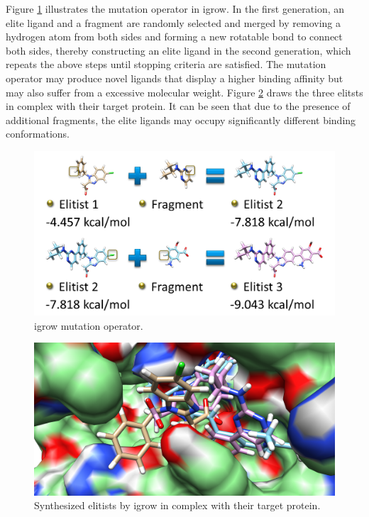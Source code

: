 Figure \ref{igrow:Mutation} illustrates the mutation operator in igrow. In the first generation, an elite ligand and a fragment are randomly selected and merged by removing a hydrogen atom from both sides and forming a new rotatable bond to connect both sides, thereby constructing an elite ligand in the second generation, which repeats the above steps until stopping criteria are satisfied. The mutation operator may produce novel ligands that display a higher binding affinity but may also suffer from a excessive molecular weight. Figure \ref{igrow:ProteinElitistsComplex} draws the three elitsts in complex with their target protein. It can be seen that due to the presence of additional fragments, the elite ligands may occupy significantly different binding conformations.

\begin{figure}
\centering
\includegraphics[width=\textwidth]{igrow/Mutation.png}
\caption{igrow mutation operator.}
\label{igrow:Mutation}
\end{figure}

\begin{figure}
\centering
\includegraphics[width=\textwidth]{igrow/ProteinElitistsComplex.png}
\caption{Synthesized elitists by igrow in complex with their target protein.}
\label{igrow:ProteinElitistsComplex}
\end{figure}

